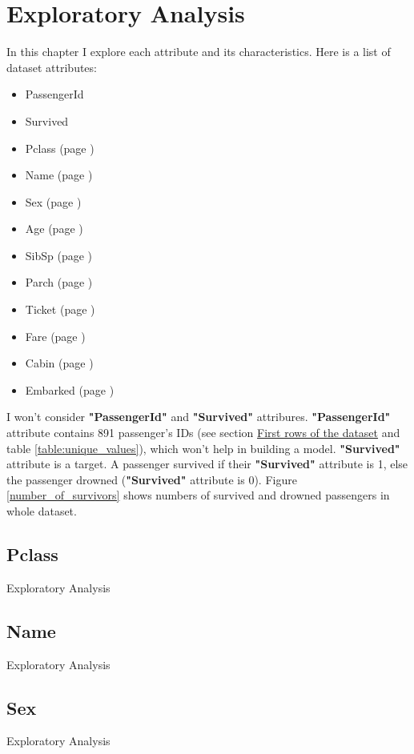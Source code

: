 \chapter{Exploratory Analysis}
In this chapter I explore each attribute and its characteristics. Here
is a list of dataset attributes:
\begin{itemize}
	\item PassengerId
    \item Survived
    \item Pclass (page \pageref{section:Pclass})
    \item Name (page \pageref{section:Name})
    \item Sex (page \pageref{section:Sex})
    \item Age (page \pageref{section:Age})
    \item SibSp (page \pageref{section:SibSp})
    \item Parch (page \pageref{section:Parch})
    \item Ticket (page \pageref{section:Ticket})
    \item Fare (page \pageref{section:Fare})
    \item Cabin (page \pageref{section:Cabin})
    \item Embarked (page \pageref{section:Embarked})
\end{itemize}

I won't consider \textbf{"PassengerId"} and \textbf{"Survived"} attribures.
\textbf{"PassengerId"} attribute contains 891 passenger's IDs (see section 
\hyperref[section:first_rows]{First rows of the dataset} and table 
\ref{table:unique_values}), which won't help in building a model.
\textbf{"Survived"} attribute is a target. A passenger survived if their 
\textbf{"Survived"} attribute is 1, else the passenger drowned 
(\textbf{"Survived"} attribute is 0). Figure \ref{number_of_survivors}
shows numbers of survived and drowned passengers in whole dataset.


\section{Pclass} \label{section:Pclass}
Exploratory Analysis


\section{Name} \label{section:Name}
Exploratory Analysis


\section{Sex} \label{section:Sex}
Exploratory Analysis


